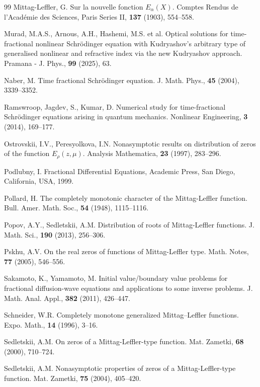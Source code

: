 \documentclass[reqno]{amsart}
\numberwithin{equation}{section}
\begin{document}
\begin{thebibliography}{99}
Mittag-Leffler, G. Sur la nouvelle fonction $E_\alpha(X)$. Comptes Rendus de l’Académie des Sciences, Paris Series II, \textbf{137} (1903), 554–558.

Murad, M.A.S., Arnous, A.H., Hashemi, M.S. et al. Optical solutions for time-fractional nonlinear Schrödinger equation with Kudryashov’s arbitrary type of generalised nonlinear and refractive index via the new Kudryashov approach. Pramana - J. Phys., \textbf{99} (2025), 63.

Naber, M. Time fractional Schrödinger equation. J. Math. Phys., \textbf{45} (2004), 3339–3352.

Ramswroop, Jagdev, S., Kumar, D. Numerical study for time-fractional Schrödinger equations arising in quantum mechanics. Nonlinear Engineering, \textbf{3} (2014), 169–177.

Ostrovskii, I.V., Peresyolkova, I.N. Nonasymptotic results on distribution of zeros of the function $E_\rho(z, \mu)$. Analysis Mathematica, \textbf{23} (1997), 283–296.

Podlubny, I. Fractional Differential Equations, Academic Press, San Diego, California, USA, 1999.

Pollard, H. The completely monotonic character of the Mittag-Leffler function. Bull. Amer. Math. Soc., \textbf{54} (1948), 1115–1116.

Popov, A.Y., Sedletskii, A.M. Distribution of roots of Mittag-Leffler functions. J. Math. Sci., \textbf{190} (2013), 256–306.

Pskhu, A.V. On the real zeros of functions of Mittag-Leffler type. Math. Notes, \textbf{77} (2005), 546–556.

Sakamoto, K., Yamamoto, M. Initial value/boundary value problems for fractional diffusion-wave equations and applications to some inverse problems. J. Math. Anal. Appl., \textbf{382} (2011), 426–447.

Schneider, W.R. Completely monotone generalized Mittag–Leffler functions. Expo. Math., \textbf{14} (1996), 3–16.

Sedletskii, A.M. On zeros of a Mittag-Leffler-type function. Mat. Zametki, \textbf{68} (2000), 710–724.

Sedletskii, A.M. Nonasymptotic properties of zeros of a Mittag-Leffler-type function. Mat.
Zametki, \textbf{75} (2004), 405–420.


\end{thebibliography}
\end{document}
